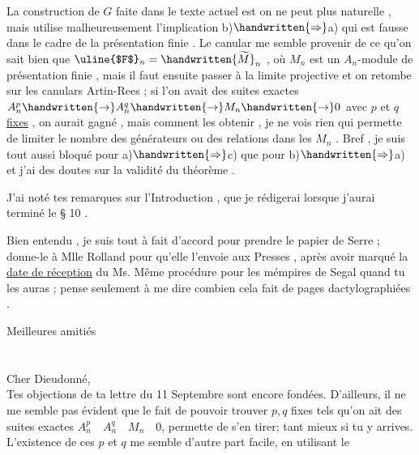 La construction de \uline{$G$} faite dans le texte actuel est on ne peut plus naturelle , mais utilise malheureusement l'implication b)$\handwritten{\Rightarrow}$a) qui est fausse dans le cadre de la présentation finie . Le canular me semble provenir de ce qu'on sait bien que $\text{\uline{$F$}}_n=\handwritten{\widetilde{M}}_n$ , où $M_n$ est un $A_n$-module de présentation finie , mais il faut ensuite passer à la limite projective \reversemarginpar{}\normalmarginpar et on retombe sur les canulars Artin-Rees ; si l'on avait des suites exactes $A_n^p\handwritten{\to}A_n^q\handwritten{\to}M_n\handwritten{\to}0$ avec $p$ et $q$ \uline{fixes} , on aurait gagné , mais comment les obtenir , je ne vois rien qui permette de limiter le nombre des générateurs ou des relations dans les $M_n$ . Bref , je suis tout aussi bloqué pour  a)$\handwritten{\Rightarrow}$c) que pour b)$\handwritten{\Rightarrow}$a) et j'ai des doutes sur la validité du théorème .

J'ai noté tes remarques sur l'Introduction , que je rédigerai lorsque j'aurai terminé le § 10 .

Bien entendu , je suis tout à fait d'accord pour prendre le papier de Serre ; donne-le à Mlle Rolland pour qu'elle l'envoie aux Presses , après avoir marqué la \uline{date de réception} du Ms. Même procédure \reversemarginpar{}\normalmarginpar pour les mémpires de Segal quand tu les auras ; pense seulement à me dire combien cela fait de pages dactylographiées .

Meilleures amitiés\\
\\
\\

Cher Dieudonné,\\

Tes objections de ta lettre du 11 Septembre sont encore fondées. D'ailleurs, il ne me semble pas évident que le fait de pouvoir trouver $p,q$ fixes tels qu'on ait des suites exactes $A_n^p\quad A_n^q\quad M_n\quad0$, permette de s'en tirer; tant mieux si tu y arrives. L'existence de ces $p$ et $q$ me semble d'autre part facile, en utilisant le

